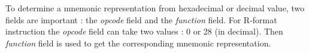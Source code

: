 	To determine a mnemonic representation from hexadecimal or decimal value, two fields are important : the \textit{opcode} field and the \textit{function} field. For R-format instruction the \textit{opcode} field can take two values : 0 or 28 (in decimal). Then \textit{function} field is used to get the corresponding mnemonic representation.